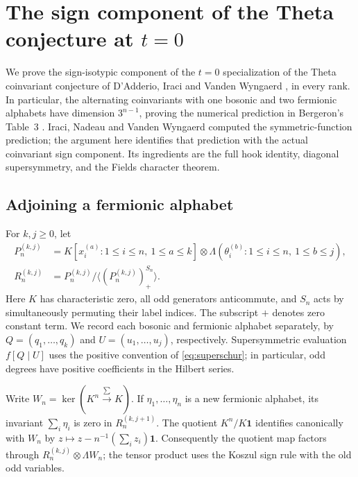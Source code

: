 \section{The sign component of the Theta conjecture at \texorpdfstring{$t=0$}{t=0}}
\label{sec:theta-sign}

We prove the sign-isotypic component of the $t=0$ specialization of
the Theta coinvariant conjecture of D'Adderio, Iraci and Vanden
Wyngaerd \cite[Conjecture~8.2]{DIV2021}, in every rank.  In particular,
the alternating coinvariants with one bosonic and two fermionic
alphabets have dimension $3^{n-1}$, proving the numerical prediction
in Bergeron's Table~3 \cite{BergeronSuper2020}.
Iraci, Nadeau and Vanden Wyngaerd
\cite[Theorem~5.6]{INV2024} computed the symmetric-function prediction;
the argument here identifies that prediction with the actual
coinvariant sign component.  Its ingredients are the full hook
identity, diagonal supersymmetry, and the Fields character theorem.

\subsection{Adjoining a fermionic alphabet}

For $k,j\geq0$, let
\begin{align*}
 P_n^{(k,j)}
   &=K[x_i^{(a)}:1\leq i\leq n,\ 1\leq a\leq k]
       \otimes\Lambda(\theta_i^{(b)}:1\leq i\leq n,\ 1\leq b\leq j),\\
 R_n^{(k,j)}
   &=P_n^{(k,j)}/\langle(P_n^{(k,j)})^{S_n}_+\rangle.
\end{align*}
Here $K$ has characteristic zero, all odd generators anticommute,
and $S_n$ acts by simultaneously permuting their label indices.
The subscript $+$ denotes zero constant term.  We record each
bosonic and fermionic alphabet separately, by
$Q=(q_1,\ldots,q_k)$ and $U=(u_1,\ldots,u_j)$, respectively.
Supersymmetric evaluation $f[Q\mid U]$ uses the positive convention
of \eqref{eq:superschur}; in particular, odd degrees have positive
coefficients in the Hilbert series.

Write $W_n=\ker(K^n\xrightarrow{\sum}K)$.  If
$\eta_1,\ldots,\eta_n$ is a new fermionic alphabet, its invariant
$\sum_i\eta_i$ is zero in $R_n^{(k,j+1)}$.  The quotient
$K^n/K\mathbf1$ identifies canonically with $W_n$ by
$z\mapsto z-n^{-1}(\sum_i z_i)\mathbf1$.
Consequently the quotient map factors through
$R_n^{(k,j)}\otimes\Lambda W_n$; the tensor product uses the Koszul
sign rule with the old odd variables.

